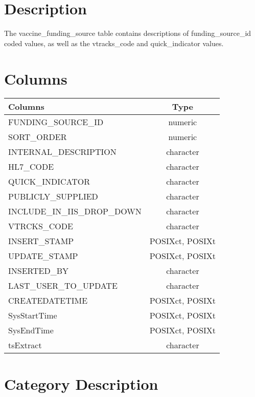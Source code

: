 \documentclass[
  letterpaper,
  DIV=11,
  numbers=noendperiod]{scrreprt}
\begin{document}
\hypertarget{description-48}{%
\section*{Description}\label{description-48}}

The vaccine\_funding\_source table contains descriptions of
funding\_source\_id coded values, as well as the vtracks\_code and
quick\_indicator values.

\hypertarget{columns-48}{%
\section*{Columns}\label{columns-48}}

\begin{longtable}{lc}
\toprule
Columns & Type \\ 
\midrule
FUNDING\_SOURCE\_ID & numeric \\ 
SORT\_ORDER & numeric \\ 
INTERNAL\_DESCRIPTION & character \\ 
HL7\_CODE & character \\ 
QUICK\_INDICATOR & character \\ 
PUBLICLY\_SUPPLIED & character \\ 
INCLUDE\_IN\_IIS\_DROP\_DOWN & character \\ 
VTRCKS\_CODE & character \\ 
INSERT\_STAMP & POSIXct, POSIXt \\ 
UPDATE\_STAMP & POSIXct, POSIXt \\ 
INSERTED\_BY & character \\ 
LAST\_USER\_TO\_UPDATE & character \\ 
CREATEDATETIME & POSIXct, POSIXt \\ 
SysStartTime & POSIXct, POSIXt \\ 
SysEndTime & POSIXct, POSIXt \\ 
tsExtract & character \\ 
\bottomrule
\end{longtable}

\hypertarget{category-description-48}{%
\section*{Category Description}\label{category-description-48}}
\end{document}
